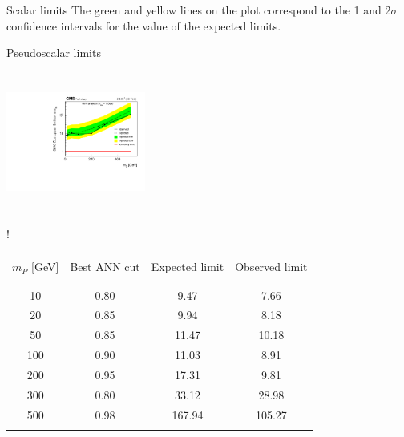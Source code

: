 \documentclass[8 pt]{beamer}
\begin{document}
\begin{frame}{Scalar limits}
   The green and yellow lines on the plot correspond to the 1 and 2$\sigma$ confidence intervals for the value of the expected limits. \vfill

\end{frame}


\begin{frame}{Pseudoscalar limits}

	\hspace{4pt}
   \begin{minipage}[c]{.02\linewidth}
	\begin{exampleblock}{}  \end{exampleblock}
   \end{minipage}	
   \hspace{5pt}	
   \begin{minipage}[c]{.40\linewidth}
   	\begin{center}
		\vspace{15pt}
		\includegraphics[width=130pt, height=130pt]{figs/limits_pseudo.pdf}
	\end{center}
   \end{minipage} \hfill
    \begin{minipage}[c]{.52\linewidth}
   	\begin{center}
	\resizebox{175pt} {!}{
   	\begin{tabular}{c|c|c|c}
		& & & \\
		$m_P$ [GeV]& Best ANN cut & Expected limit & Observed limit \\ 
		& & & \\ 
		\hline \hline
		& & &  \\
		10 & 0.80 & 9.47 & 7.66 \\
            	20 & 0.85 & 9.94 & 8.18 \\
            	50 & 0.85 & 11.47 & 10.18 \\
            	100 & 0.90 &11.03 & 8.91 \\
            	200 & 0.95 & 17.31 & 9.81 \\
            	300 & 0.80 & 33.12 & 28.98 \\
            	500 & 0.98 & 167.94 & 105.27 \\
		& & & \\
          \end{tabular}
          }
          \end{center}
   \end{minipage} \hfill 
   

\end{frame}
\end{document}
